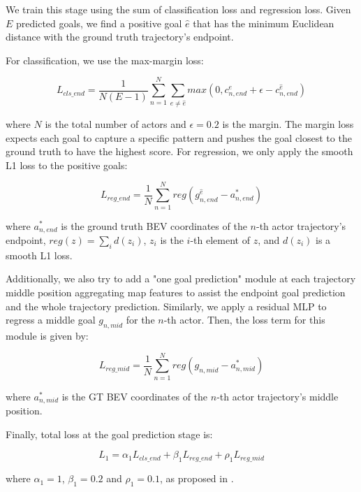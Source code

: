 We train this stage using the sum of classification loss and regression loss. Given $E$ predicted goals, we find a positive goal $\hat{e}$ that has the minimum Euclidean distance with the ground truth trajectory's endpoint. 

For classification, we use the max-margin loss:

\begin{equation}
	L_{cls\_end}=\frac{1}{N(E-1)}\sum_{n=1}^N\sum_{e\neq \hat{e}}{max(0,c^e_{n,end}+\epsilon -c^{\hat{e}}_{n,end})}
\end{equation}

where $N$ is the total number of actors and $\epsilon=0.2$ is the margin. The margin loss expects each goal to capture a specific pattern and pushes the goal closest to the ground truth to have the highest score. For regression, we only apply the smooth L1 loss to the positive goals:

\begin{equation}
	L_{reg\_end}=\frac{1}{N}\sum_{n=1}^N{reg(g_{n,end}^{\hat{e}}-a^{*}_{n,end})}
\end{equation}

where $a^{*}_{n,end}$ is the ground truth \ac{BEV} coordinates of the $n$-th actor trajectory's endpoint, $reg(z) = \sum_id(z_i)$, $z_i$ is the $i$-th element of $z$, and $d(z_i)$ is a smooth L1 loss.

Additionally, we also try to add a "one goal prediction" module at each trajectory middle position aggregating map features to assist the endpoint goal prediction and the whole trajectory prediction. Similarly, we apply a residual \ac{MLP} to regress a middle goal $g_{n,mid}$ for the $n$-th actor. Then, the loss term for this module is given by:

\begin{equation}
	L_{reg\_mid} = \frac{1}{N}\sum_{n=1}^N {reg(g_{n,mid}-a^*_{n,mid})}
\end{equation}

where $a^*_{n,mid}$ is the \ac{GT} \ac{BEV} coordinates of the $n$-th actor trajectory's middle position.

Finally, total loss at the goal prediction stage is:

\begin{equation}
	L_{1} = \alpha_1 L_{cls\_end} + \beta_1 L_{reg\_end} +\rho_1 L_{reg\_mid}
\end{equation}

where $\alpha_1 = 1$, $\beta_1 = 0.2$ and $\rho_1 = 0.1$, as proposed in \cite{wang2022ganet}.

